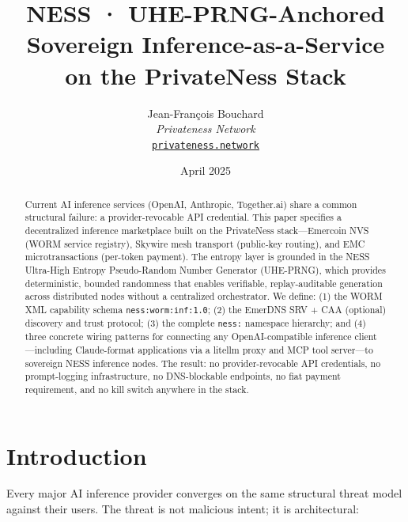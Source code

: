 \documentclass[11pt,a4paper]{article}
\title{%
  \textbf{NESS · UHE-PRNG-Anchored\\
  Sovereign Inference-as-a-Service\\
  on the PrivateNess Stack}
  \vspace{4pt}
}
\author{%
  Jean-Fran\c{c}ois Bouchard\\
  \textit{Privateness Network}\\
  \href{https://privateness.network}{\texttt{privateness.network}}
}
\date{April 2025}
\begin{document}

\maketitle
\thispagestyle{fancy}

\begin{abstract}
Current AI inference services (OpenAI, Anthropic, Together.ai) share a common structural failure: a provider-revocable API credential. This paper specifies a decentralized inference marketplace built on the PrivateNess stack—Emercoin NVS (WORM service registry), Skywire mesh transport (public-key routing), and EMC microtransactions (per-token payment). The entropy layer is grounded in the NESS Ultra-High Entropy Pseudo-Random Number Generator (UHE-PRNG), which provides deterministic, bounded randomness that enables verifiable, replay-auditable generation across distributed nodes without a centralized orchestrator. We define: (1) the WORM XML capability schema \texttt{ness:worm:inf:1.0}; (2) the EmerDNS SRV + CAA (optional) discovery and trust protocol; (3) the complete \texttt{ness:} namespace hierarchy; and (4) three concrete wiring patterns for connecting any OpenAI-compatible inference client—including Claude-format applications via a litellm proxy and MCP tool server—to sovereign NESS inference nodes. The result: no provider-revocable API credentials, no prompt-logging infrastructure, no DNS-blockable endpoints, no fiat payment requirement, and no kill switch anywhere in the stack.
\end{abstract}

\tableofcontents
\vspace{8pt}

\section{Introduction}
\label{sec:intro}

Every major AI inference provider converges on the same structural threat model against their users. The threat is not malicious intent; it is architectural:
\end{document}

